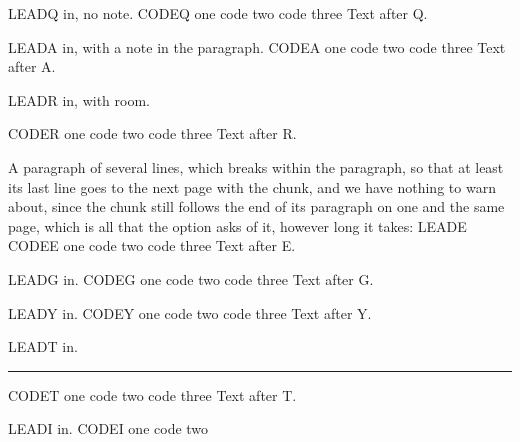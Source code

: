 LEADQ in, no note.
\endmoddef\nwstartdeflinemarkup\nwenddeflinemarkup
CODEQ one
code two
code three
\nwendcode{}\nwdocspar
Text after Q.
\nwenddocs{}

LEADA in, with a note in the paragraph.
\endmoddef\nwstartdeflinemarkup\nwenddeflinemarkup
CODEA one
code two
code three
\nwendcode{}\nwdocspar
Text after A.
\nwenddocs{}

LEADR in, with room.

\endmoddef\nwstartdeflinemarkup\nwenddeflinemarkup
CODER one
code two
code three
\nwendcode{}\nwdocspar
Text after R.
\nwenddocs{}

A paragraph of several lines, which breaks within the paragraph, so that at
least its last line goes to the next page with the chunk, and we have nothing to
warn about, since the chunk still follows the end of its paragraph on one and the
same page, which is all that the option asks of it, however long it takes: LEADE
\endmoddef\nwstartdeflinemarkup\nwenddeflinemarkup
CODEE one
code two
code three
\nwendcode{}\nwdocspar
Text after E.
\nwenddocs{}

LEADG in.
\goodbreak
{}\endmoddef\nwstartdeflinemarkup\nwenddeflinemarkup
CODEG one
code two
code three
\nwendcode{}\nwdocspar
Text after G.
\nwenddocs{}

LEADY in.
\clearpage
{}\endmoddef\nwstartdeflinemarkup\nwenddeflinemarkup
CODEY one
code two
code three
\nwendcode{}\nwdocspar
Text after Y.
\nwenddocs{}

\clearpage
LEADT in. \rule{1pt}{0.97\textheight}
\endmoddef\nwstartdeflinemarkup\nwenddeflinemarkup
CODET one
code two
code three
\nwendcode{}\nwdocspar
Text after T.
\nwenddocs{}

\clearpage
\begin{minipage}{\linewidth}
LEADI in.
\endmoddef\nwstartdeflinemarkup\nwenddeflinemarkup
CODEI one
code two
\nwendcode{}\nwdocspar
\nwenddocs{}
\end{minipage}

